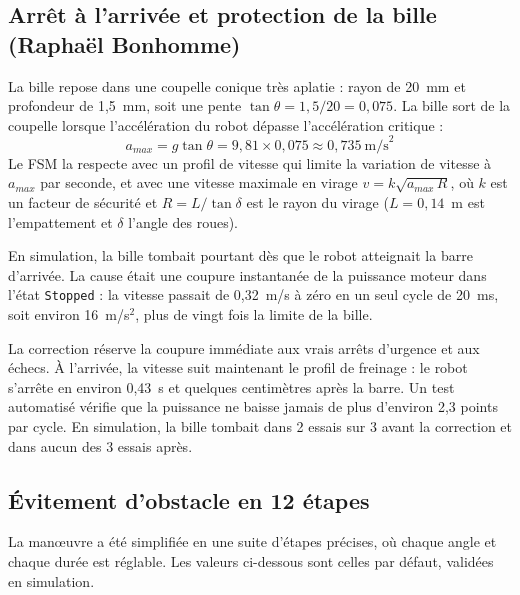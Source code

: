 \subsection{Arrêt à l'arrivée et protection de la bille (Raphaël Bonhomme)}
La bille repose dans une coupelle conique très aplatie : rayon de 20~mm et profondeur de 1,5~mm, soit une pente $\tan\theta = 1{,}5 / 20 = 0{,}075$.
La bille sort de la coupelle lorsque l'accélération du robot dépasse l'accélération critique :
\[
    a_{max} = g \tan\theta = 9{,}81 \times 0{,}075 \approx 0{,}735~\text{m/s}^2
\]
Le FSM la respecte avec un profil de vitesse qui limite la variation de vitesse à $a_{max}$ par seconde, et avec une vitesse maximale en virage $v = k\sqrt{a_{max}\,R}$, où $k$ est un facteur de sécurité et $R = L / \tan\delta$ est le rayon du virage ($L = 0{,}14$~m est l'empattement et $\delta$ l'angle des roues).

En simulation, la bille tombait pourtant dès que le robot atteignait la barre d'arrivée.
La cause était une coupure instantanée de la puissance moteur dans l'état \texttt{Stopped} : la vitesse passait de 0,32~m/s à zéro en un seul cycle de 20~ms, soit environ 16~m/s$^2$, plus de vingt fois la limite de la bille.

La correction réserve la coupure immédiate aux vrais arrêts d'urgence et aux échecs.
À l'arrivée, la vitesse suit maintenant le profil de freinage : le robot s'arrête en environ 0,43~s et quelques centimètres après la barre.
Un test automatisé vérifie que la puissance ne baisse jamais de plus d'environ 2,3 points par cycle.
En simulation, la bille tombait dans 2 essais sur 3 avant la correction et dans aucun des 3 essais après.

\subsection{Évitement d'obstacle en 12 étapes}
La manœuvre a été simplifiée en une suite d'étapes précises, où chaque angle et chaque durée est réglable.
Les valeurs ci-dessous sont celles par défaut, validées en simulation.


